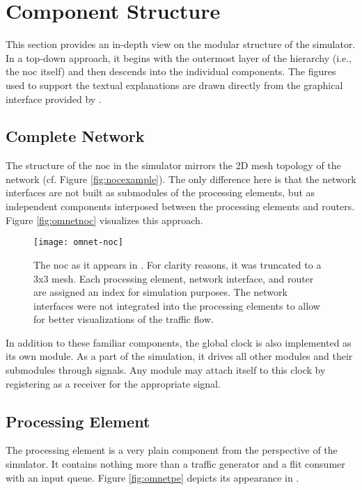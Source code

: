 \section{Component Structure}\label{sec:componentstructure}
This section provides an in-depth view on the modular structure of the simulator. In a top-down approach, it begins with the outermost layer of the
hierarchy (i.e., the \gls{noc} itself) and then descends into the individual components. The figures used to support the textual explanations are
drawn directly from the graphical interface provided by \omnet{}.

\subsection{Complete Network}
The structure of the \gls{noc} in the simulator mirrors the 2D mesh topology of the network (cf. Figure \ref{fig:nocexample}). The only difference
here is that the network interfaces are not built as submodules of the processing elements, but as independent components interposed between the
processing elements and routers. Figure \vref{fig:omnetnoc} visualizes this approach.

\begin{figure}
    \centering
    \texttt{[image: omnet-noc]}
    \caption[Simulator view of the NoC]{The \gls{noc} as it appears in \omnet{}. For clarity reasons, it was truncated to a 3x3 mesh. Each processing
    element, network interface, and router are assigned an index for simulation purposes. The network interfaces were not integrated into the
    processing elements to allow for better visualizations of the traffic flow.}
    \label{fig:omnetnoc}
\end{figure}

In addition to these familiar components, the global clock is also implemented as its own module. As a part of the simulation, it drives all other
modules and their submodules through signals. Any module may attach itself to this clock by registering as a receiver for the appropriate signal.

\subsection{Processing Element}
The processing element is a very plain component from the perspective of the simulator. It contains nothing more than a traffic generator and a flit
consumer with an input queue. Figure \vref{fig:omnetpe} depicts its appearance in \omnet{}.

